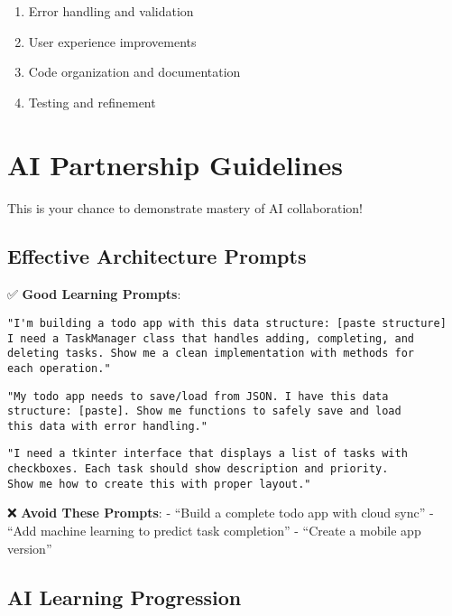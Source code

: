 \documentclass[
  letterpaper,
  DIV=11,
  numbers=noendperiod,
  oneside]{scrreprt}
\providecommand{\tightlist}{%
  \setlength{\itemsep}{0pt}\setlength{\parskip}{0pt}}\usepackage{longtable,booktabs,array}
\begin{document}
\begin{enumerate}
\def\labelenumi{\arabic{enumi}.}
\tightlist
\item
  Error handling and validation
\item
  User experience improvements
\item
  Code organization and documentation
\item
  Testing and refinement
\end{enumerate}

\section{AI Partnership Guidelines}\label{ai-partnership-guidelines-11}

This is your chance to demonstrate mastery of AI collaboration!

\subsection{Effective Architecture
Prompts}\label{effective-architecture-prompts}

✅ \textbf{Good Learning Prompts}:

\begin{verbatim}
"I'm building a todo app with this data structure: [paste structure]
I need a TaskManager class that handles adding, completing, and 
deleting tasks. Show me a clean implementation with methods for 
each operation."
\end{verbatim}

\begin{verbatim}
"My todo app needs to save/load from JSON. I have this data 
structure: [paste]. Show me functions to safely save and load 
this data with error handling."
\end{verbatim}

\begin{verbatim}
"I need a tkinter interface that displays a list of tasks with 
checkboxes. Each task should show description and priority. 
Show me how to create this with proper layout."
\end{verbatim}

❌ \textbf{Avoid These Prompts}: - ``Build a complete todo app with
cloud sync'' - ``Add machine learning to predict task completion'' -
``Create a mobile app version''

\subsection{AI Learning Progression}\label{ai-learning-progression-11}
\end{document}
